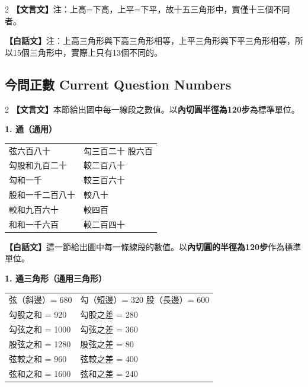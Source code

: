 \documentclass[11pt,a4paper]{article}
\begin{document}
\begin{paracol}{2}
\textbf{【文言文】}注：上高=下高，上平=下平，故十五三角形中，實僅十三個不同者。

\switchcolumn
\textbf{【白話文】}注：上高三角形與下高三角形相等，上平三角形與下平三角形相等，所以15個三角形中，實際上只有13個不同的。
\end{paracol}

\subsection{今問正數 Current Question Numbers}
\label{subsec:numbers}

\begin{paracol}{2}
\textbf{【文言文】}本節給出圖中每一線段之數值。以\textbf{內切圓半徑為120步}為標準單位。

\textbf{1. 通（通用）}

\begin{center}
\begin{tabular}{ll}
弦六百八十 & 勾三百二十 \quad 股六百 \\
勾股和九百二十 & 較二百八十 \\
勾和一千 & 較三百六十 \\
股和一千二百八十 & 較八十 \\
較和九百六十 & 較四百 \\
和和一千六百 & 較二百四十 \\
\end{tabular}
\end{center}

\switchcolumn
\textbf{【白話文】}這一節給出圖中每一條線段的數值。以\textbf{內切圓的半徑為120步}作為標準單位。

\textbf{1. 通三角形（通用三角形）}

\begin{center}
\begin{tabular}{ll}
弦（斜邊）= 680 & 勾（短邊）= 320 \quad 股（長邊）= 600 \\
勾股之和 = 920 & 勾股之差 = 280 \\
勾弦之和 = 1000 & 勾弦之差 = 360 \\
股弦之和 = 1280 & 股弦之差 = 80 \\
弦較之和 = 960 & 弦較之差 = 400 \\
弦和之和 = 1600 & 弦和之差 = 240 \\
\end{tabular}
\end{center}
\end{paracol}
\end{document}
